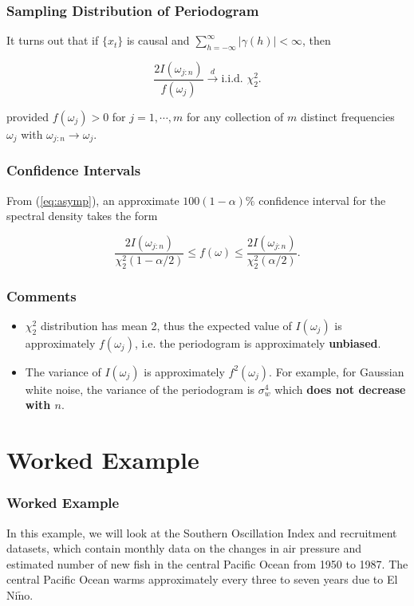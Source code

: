 \documentclass[%
xcolor=pdftex]{beamer}
\begin{document}
\begin{frame}
\frametitle{Sampling Distribution of Periodogram}

It turns out that if $\{ x_t \}$ is causal and $\sum_{h =-\infty}^{\infty} |\gamma(h)| < \infty$, then

\begin{equation} \label{eq:asymp}
\frac{2 I(\omega_{j:n})}{f(\omega_j)} \xrightarrow{d} \text{i.i.d. } \chi_2^2.
\end{equation}

provided $f(\omega_j) > 0$ for $j = 1, \cdots, m$ for any collection of $m$ distinct frequencies $\omega_j$ with $\omega_{j:n} \to \omega_j$.

\end{frame}

\begin{frame}
\frametitle{Confidence Intervals}

From (\ref{eq:asymp}), an approximate $100(1-\alpha)\%$ confidence interval for the spectral density takes the form

\begin{equation} \label{eq:CI}
\frac{2 I(\omega_{j:n})}{\chi_2^2(1-\alpha/2)} \leq f(\omega) \leq \frac{2 I(\omega_{j:n})}{\chi_2^2(\alpha/2)}.
\end{equation}

\end{frame}

\begin{frame}
\frametitle{Comments}

\begin{itemize}
\item $\chi_2^2$ distribution has mean 2, thus the expected value of $I(\omega_j)$ is approximately $f(\omega_j)$, i.e. the periodogram is approximately \textbf{unbiased}.
\item The variance of $I(\omega_j)$ is approximately $f^2(\omega_j)$. For example, for Gaussian white noise, the variance of the periodogram is $\sigma_w^4$ which \textbf{does not decrease with $n$}.
\end{itemize}

\end{frame}

\section{Worked Example}
\frame{\tableofcontents[currentsection]}

\begin{frame}
\frametitle{Worked Example}

In this example, we will look at the Southern Oscillation Index and recruitment datasets, which contain monthly data on the changes in air pressure and estimated number of new fish in the central Pacific Ocean from 1950 to 1987. The central Pacific Ocean warms approximately every three to seven years due to El Ni$\tilde{\text{n}}$o.

\end{frame}
\end{document}
